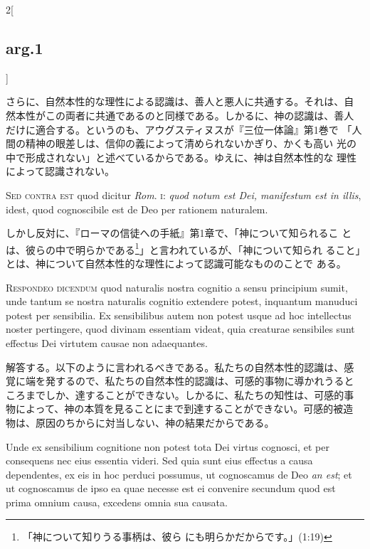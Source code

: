 \documentclass[paper=a4paper,fontsize=10pt,jafontsize=9pt,titlepage]{jlreq}
\begin{document}
\begin{paracol}{2}[\subsection{arg.1}]
\switchcolumn

さらに、自然本性的な理性による認識は、善人と悪人に共通する。それは、自
然本性がこの両者に共通であるのと同様である。しかるに、神の認識は、善人
だけに適合する。というのも、アウグスティヌスが『三位一体論』第1巻で
「人間の精神の眼差しは、信仰の義によって清められないかぎり、かくも高い
光の中で形成されない」と述べているからである。ゆえに、神は自然本性的な
理性によって認識されない。

\switchcolumn*[\subsection{s.c.}]

{\scshape Sed contra est} quod dicitur {\itshape Rom}. {\scshape i}: {\itshape quod notum
est Dei, manifestum est in illis}, idest, quod cognoscibile est de Deo
per rationem naturalem.

\switchcolumn

しかし反対に、『ローマの信徒への手紙』第1章で、「神について知られるこ
とは、彼らの中で明らかである\footnote{「神について知りうる事柄は、彼ら
にも明らかだからです。」(1:19)}」と言われているが、「神について知られ
ること」とは、神について自然本性的な理性によって認識可能なもののことで
ある。


{\scshape Respondeo dicendum} quod naturalis nostra cognitio a sensu
principium sumit, unde tantum se nostra naturalis cognitio extendere
potest, inquantum manuduci potest per sensibilia. Ex sensibilibus
autem non potest usque ad hoc intellectus noster pertingere, quod
divinam essentiam videat, quia creaturae sensibiles sunt effectus Dei
virtutem causae non adaequantes.

\switchcolumn

解答する。以下のように言われるべきである。私たちの自然本性的認識は、感
覚に端を発するので、私たちの自然本性的認識は、可感的事物に導かれうると
ころまでしか、達することができない。しかるに、私たちの知性は、可感的事
物によって、神の本質を見ることにまで到達することができない。可感的被造
物は、原因のちからに対当しない、神の結果だからである。

\switchcolumn*

Unde ex sensibilium cognitione non potest tota Dei virtus cognosci, et
per consequens nec eius essentia videri. Sed quia sunt eius effectus a
causa dependentes, ex eis in hoc perduci possumus, ut cognoscamus de
Deo {\itshape an est}; et ut cognoscamus de ipso ea quae necesse est ei
convenire secundum quod est prima omnium causa, excedens omnia sua
causata.


\end{paracol}
\end{document}
